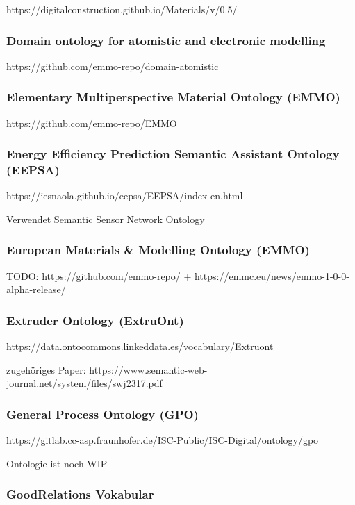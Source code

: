 \documentclass{article}
\begin{document}
https://digitalconstruction.github.io/Materials/v/0.5/

\subsubsection{Domain ontology for atomistic and electronic modelling}

https://github.com/emmo-repo/domain-atomistic

\subsubsection{Elementary Multiperspective Material Ontology (EMMO)}

https://github.com/emmo-repo/EMMO

\subsubsection{Energy Efficiency Prediction Semantic Assistant Ontology (EEPSA)}

https://iesnaola.github.io/eepsa/EEPSA/index-en.html

Verwendet Semantic Sensor Network Ontology

\subsubsection{European Materials \& Modelling Ontology (EMMO)}

TODO: https://github.com/emmo-repo/ + https://emmc.eu/news/emmo-1-0-0-alpha-release/

\subsubsection{Extruder Ontology (ExtruOnt)}

https://data.ontocommons.linkeddata.es/vocabulary/Extruont

zugehöriges Paper: https://www.semantic-web-journal.net/system/files/swj2317.pdf

\subsubsection{General Process Ontology (GPO)}

https://gitlab.cc-asp.fraunhofer.de/ISC-Public/ISC-Digital/ontology/gpo

Ontologie ist noch WIP

\subsubsection{GoodRelations Vokabular}
\end{document}
